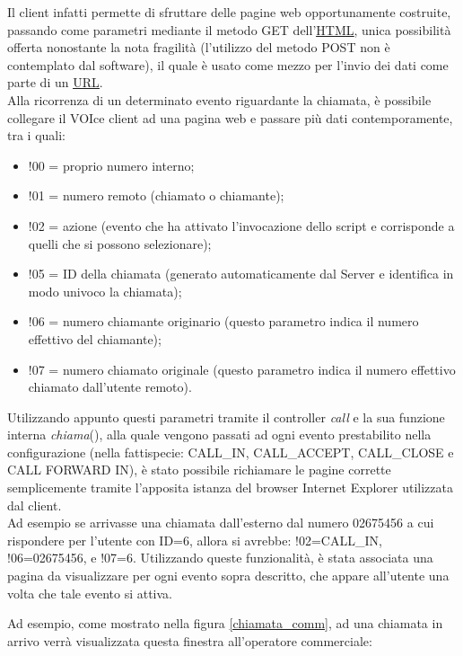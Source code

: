 \noindent
Il client infatti permette di sfruttare delle pagine web opportunamente costruite, passando come parametri mediante il metodo GET dell'\hyperlink{html}{\underline{HTML}}, unica possibilit\`a offerta nonostante la nota fragilit\`a (l'utilizzo del metodo POST non \`e contemplato dal software), il quale \`e usato come mezzo per l'invio dei dati come parte di un \hyperlink{url}{\underline{URL}}. \\
Alla ricorrenza di un determinato evento riguardante la chiamata, \`e possibile collegare il VOIce client ad una pagina web e passare pi\`u dati contemporamente, tra i quali: 
\begin{itemize}
 \item !00 = proprio numero interno;
 \item !01 = numero remoto (chiamato o chiamante);
 \item !02 = azione (evento che ha attivato l'invocazione dello script e corrisponde a quelli che si possono selezionare);
 \item !05 = ID della chiamata (generato automaticamente dal Server e identifica in modo univoco la chiamata);
 \item !06 = numero chiamante originario (questo parametro indica il numero effettivo del chiamante);
 \item !07 = numero chiamato originale (questo parametro indica il numero effettivo chiamato dall'utente remoto).
\end{itemize}
\noindent
Utilizzando appunto questi parametri tramite il controller \textit{call} e la sua funzione interna \textit{chiama}(), alla quale vengono passati ad ogni evento prestabilito nella configurazione (nella fattispecie: CALL\_IN, CALL\_ACCEPT, CALL\_CLOSE e CALL FORWARD IN), \`e stato possibile richiamare le pagine corrette semplicemente tramite l'apposita istanza del browser Internet Explorer utilizzata dal client. \\
Ad esempio se arrivasse una chiamata dall'esterno dal numero 02675456 a cui rispondere per l'utente con ID=6, allora si avrebbe: !02=CALL\_IN, !06=02675456, e !07=6. Utilizzando queste funzionalit\`a, \`e stata associata una pagina da visualizzare per ogni evento sopra descritto, che appare all'utente una volta che tale evento si attiva. 

\newpage
Ad esempio, come mostrato nella figura \ref{chiamata_comm}, ad una chiamata in arrivo verr\`a visualizzata questa finestra all'operatore commerciale:

